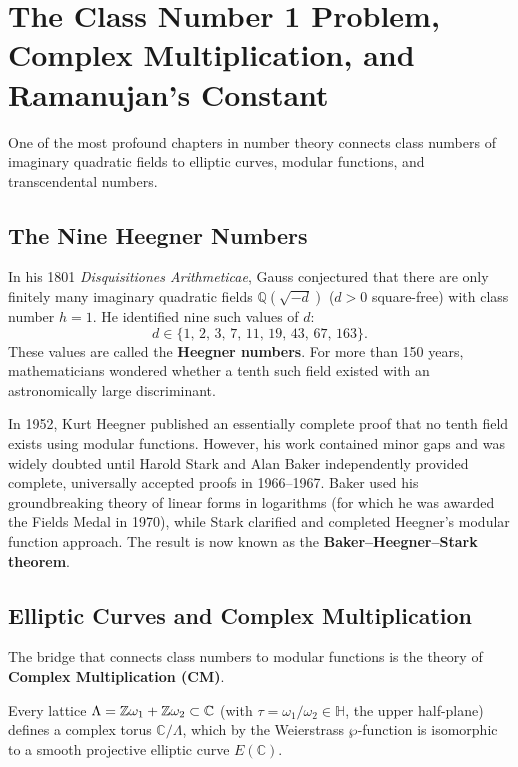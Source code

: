 \documentclass[a4paper]{article}
\begin{document}
\section{The Class Number 1 Problem, Complex Multiplication, and Ramanujan's Constant}
\label{sec:class_number_one_j_invariant}
One of the most profound chapters in number theory connects class numbers of imaginary quadratic fields to elliptic curves, modular functions, and transcendental numbers.

\subsection{The Nine Heegner Numbers}
In his 1801 \emph{Disquisitiones Arithmeticae}, Gauss conjectured that there are only finitely many imaginary quadratic fields $\mathbb{Q}(\sqrt{-d})$ ($d > 0$ square-free) with class number $h = 1$. He identified nine such values of $d$:
\begin{equation}
 d \in \{1, \, 2, \, 3, \, 7, \, 11, \, 19, \, 43, \, 67, \, 163\}.
 \label{eq:heegner_numbers}
\end{equation}
These values are called the \textbf{Heegner numbers}. For more than 150 years, mathematicians wondered whether a tenth such field existed with an astronomically large discriminant. 

In 1952, Kurt Heegner published an essentially complete proof that no tenth field exists using modular functions. However, his work contained minor gaps and was widely doubted until Harold Stark and Alan Baker independently provided complete, universally accepted proofs in 1966--1967. Baker used his groundbreaking theory of linear forms in logarithms (for which he was awarded the Fields Medal in 1970), while Stark clarified and completed Heegner's modular function approach. The result is now known as the \textbf{Baker--Heegner--Stark theorem}.

\subsection{Elliptic Curves and Complex Multiplication}
The bridge that connects class numbers to modular functions is the theory of \textbf{Complex Multiplication (CM)}. 

Every lattice $\Lambda = \mathbb{Z}\omega_1 + \mathbb{Z}\omega_2 \subset \mathbb{C}$ (with $\tau = \omega_1/\omega_2 \in \mathbb{H}$, the upper half-plane) defines a complex torus $\mathbb{C}/\Lambda$, which by the Weierstrass $\wp$-function is isomorphic to a smooth projective elliptic curve $E(\mathbb{C})$.
\end{document}
